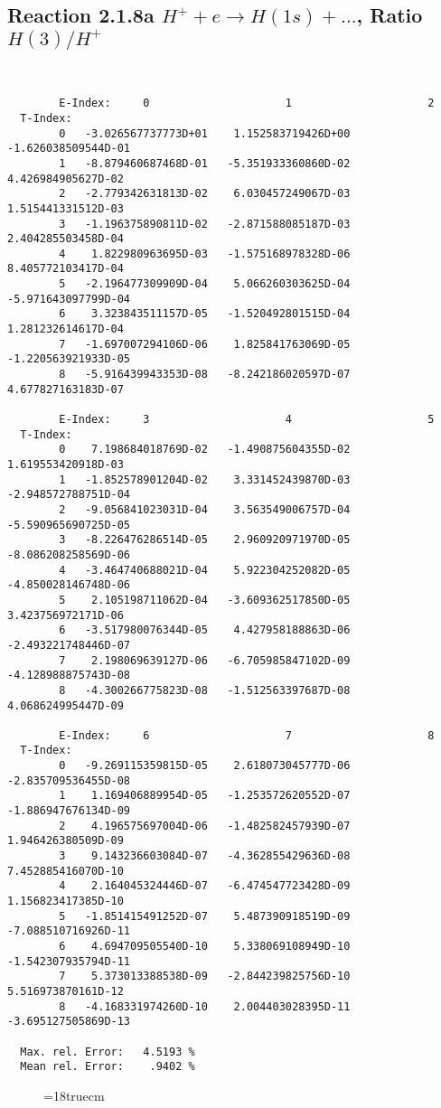 \subsection{
Reaction 2.1.8a  $H^+ + e \rightarrow H(1s) + ...$,  Ratio $H(3)/H^+$
}

\begin{verbatim}


        E-Index:     0                     1                     2
  T-Index:
        0   -3.026567737773D+01    1.152583719426D+00   -1.626038509544D-01
        1   -8.879460687468D-01   -5.351933360860D-02    4.426984905627D-02
        2   -2.779342631813D-02    6.030457249067D-03    1.515441331512D-03
        3   -1.196375890811D-02   -2.871588085187D-03    2.404285503458D-04
        4    1.822980963695D-03   -1.575168978328D-06    8.405772103417D-04
        5   -2.196477309909D-04    5.066260303625D-04   -5.971643097799D-04
        6    3.323843511157D-05   -1.520492801515D-04    1.281232614617D-04
        7   -1.697007294106D-06    1.825841763069D-05   -1.220563921933D-05
        8   -5.916439943353D-08   -8.242186020597D-07    4.677827163183D-07

        E-Index:     3                     4                     5
  T-Index:
        0    7.198684018769D-02   -1.490875604355D-02    1.619553420918D-03
        1   -1.852578901204D-02    3.331452439870D-03   -2.948572788751D-04
        2   -9.056841023031D-04    3.563549006757D-04   -5.590965690725D-05
        3   -8.226476286514D-05    2.960920971970D-05   -8.086208258569D-06
        4   -3.464740688021D-04    5.922304252082D-05   -4.850028146748D-06
        5    2.105198711062D-04   -3.609362517850D-05    3.423756972171D-06
        6   -3.517980076344D-05    4.427958188863D-06   -2.493221748446D-07
        7    2.198069639127D-06   -6.705985847102D-09   -4.128988875743D-08
        8   -4.300266775823D-08   -1.512563397687D-08    4.068624995447D-09

        E-Index:     6                     7                     8
  T-Index:
        0   -9.269115359815D-05    2.618073045777D-06   -2.835709536455D-08
        1    1.169406889954D-05   -1.253572620552D-07   -1.886947676134D-09
        2    4.196575697004D-06   -1.482582457939D-07    1.946426380509D-09
        3    9.143236603084D-07   -4.362855429636D-08    7.452885416070D-10
        4    2.164045324446D-07   -6.474547723428D-09    1.156823417385D-10
        5   -1.851415491252D-07    5.487390918519D-09   -7.088510716926D-11
        6    4.694709505540D-10    5.338069108949D-10   -1.542307935794D-11
        7    5.373013388538D-09   -2.844239825756D-10    5.516973870161D-12
        8   -4.168331974260D-10    2.004403028395D-11   -3.695127505869D-13

  Max. rel. Error:   4.5193 %
  Mean rel. Error:    .9402 %

\end{verbatim}
\begin{figure} \label{2.1.8ra}
\epsfxsize=18truecm
\end{figure}
\newpage



